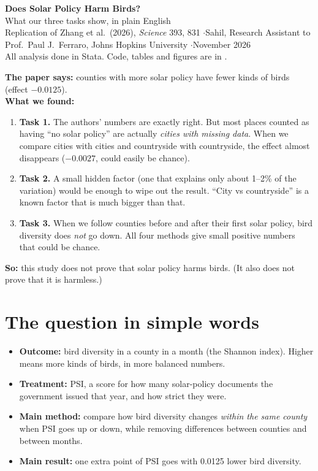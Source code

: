 \documentclass[11pt]{article}
\begin{document}
\begin{center}
{\LARGE\bfseries Does Solar Policy Harm Birds?}\\[4pt]
{\large What our three tasks show, in plain English}\\[6pt]
{\small Replication of Zhang et al.\ (2026), \textit{Science} 393, 831 \quad$\cdot$\quad Sahil, Research Assistant to Prof.\ Paul J.\ Ferraro, Johns Hopkins University \quad$\cdot$\quad November 2026}\\[2pt]
{\small All analysis done in Stata. Code, tables and figures are in .}
\end{center}

\begin{summarybox}
\small
\textbf{The paper says:} counties with more solar policy have fewer kinds of birds (effect $-0.0125$).\\[3pt]
\textbf{What we found:}
\begin{enumerate}[leftmargin=14pt]
\item \textbf{Task 1.} The authors' numbers are exactly right. But most places counted as having ``no solar policy'' are actually \emph{cities with missing data}. When we compare cities with cities and countryside with countryside, the effect almost disappears ($-0.0027$, could easily be chance).
\item \textbf{Task 2.} A small hidden factor (one that explains only about 1--2\% of the variation) would be enough to wipe out the result. ``City vs countryside'' is a known factor that is much bigger than that.
\item \textbf{Task 3.} When we follow counties before and after their first solar policy, bird diversity does \emph{not} go down. All four methods give small positive numbers that could be chance.
\end{enumerate}
\textbf{So:} this study does not prove that solar policy harms birds. (It also does not prove that it is harmless.)
\end{summarybox}

\section{The question in simple words}
\begin{itemize}
\item \textbf{Outcome:} bird diversity in a county in a month (the Shannon index). Higher means more kinds of birds, in more balanced numbers.
\item \textbf{Treatment:} PSI, a score for how many solar-policy documents the government issued that year, and how strict they were.
\item \textbf{Main method:} compare how bird diversity changes \emph{within the same county} when PSI goes up or down, while removing differences between counties and between months.
\item \textbf{Main result:} one extra point of PSI goes with 0.0125 lower bird diversity.
\end{itemize}
\end{document}
